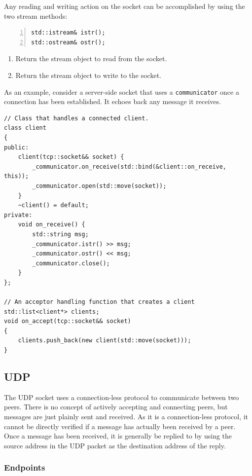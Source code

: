 \documentclass[10pt,a4paper,openany]{mudbook}
\newcommand{\indexrm}[2][]{\textrm{#2}\index{#2#1}}
\newenvironment{enumeratedef}
  {\begin{enumerate}[topsep=0.5em,itemsep=0em,parsep=0em,font=\small]
     \small}
  {\end{enumerate}}
\begin{document}
Any reading and writing action on the socket can be accomplished by using
the two stream methods:

\begin{lstlisting}[style=definition,numbers=left]
std::istream& istr();
std::ostream& ostr();
\end{lstlisting}
\begin{enumeratedef}
  \item Return the stream object to read from the socket.
  \item Return the stream object to write to the socket.
\end{enumeratedef}

As an example, consider a server-side socket that uses a \texttt{communicator}
once a connection has been established. It echoes back any message it receives.

\begin{lstlisting}[style=snippet]
// Class that handles a connected client.
class client
{
public:
    client(tcp::socket&& socket) {
        _communicator.on_receive(std::bind(&client::on_receive, this));
        _communicator.open(std::move(socket));
    }
    ~client() = default;
private:
    void on_receive() {
        std::string msg;
        _communicator.istr() >> msg;
        _communicator.ostr() << msg;
        _communicator.close();
    }
};

// An acceptor handling function that creates a client
std::list<client*> clients;
void on_accept(tcp::socket&& socket)
{
    clients.push_back(new client(std::move(socket)));
}
\end{lstlisting}

\subsection{UDP}

The \indexrm{UDP} socket uses a connection-less protocol to communicate
between two peers. There is no concept of actively accepting and connecting
peers, but messages are just plainly sent and received. As it is a
connection-less protocol, it cannot be directly verified if a message has
actually been received by a peer. Once a message has been received, it is
generally be replied to by using the source address in the UDP packet as
the destination address of the reply.

\subsubsection{Endpoints}
\end{document}
